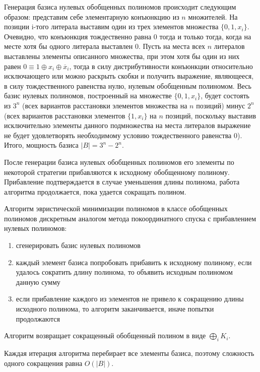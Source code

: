 \documentclass[a4paper,12pt,titlepage,finall]{article}
\begin{document}
Генерация базиса нулевых обобщенных полиномов происходит следующим образом: представим себе элементарную конъюнкцию из $ n $ множителей. На позиции i-того литерала выставим один из трех элементов множества $ \{ 0, 1, x_i \} $. Очевидно, что конъюнкция тождественно равна 0 тогда и только тогда, когда на месте хотя бы одного литерала выставлен 0. Пусть на места всех $ n $ литералов выставлены элементы описанного множества, при этом хотя бы один из них равен $ 0 \equiv 1 \oplus x_i \oplus \overline x_i $, тогда в силу дистрибутивности конъюнкции относительно исключающего или можно раскрыть скобки и получить выражение, являющееся, в силу тождественного равенства нулю, нулевым обобщенным полиномом. Весь базис нулевых полиномов, построенный на множестве $ \{ 0, 1, x_i \} $, будет состоять из $ 3^n $ (всех вариантов расстановки элементов множества на $ n $ позиций) минус $ 2^n $ (всех вариантов расстановки элементов $ \{ 1, x_i \} $ на $ n $ позиций, поскольку выставив исключительно элементы данного подмножества на места литералов выражение не будет удовлетворять необходимому условию тождественного равенства 0). Итого, мощность базиса $ \left| B \right| = 3^n - 2^n. $

После генерации базиса нулевых обобщенных полиномов его элементы по некоторой стратегии прибавляются к исходному обобщенному полиному. Прибавление подтверждается в случае уменьшения длины полинома, работа алгоритма продолжается, пока удается сокращать полином.

Алгоритм эвристической минимизации полиномов в классе обобщенных полиномов дискретным аналогом метода покоординатного спуска с прибавлением нулевых полиномов:
\begin{enumerate}
    \item сгенерировать базис нулевых полиномов
    \item каждый элемент базиса попробовать прибавить к исходному полиному, если удалось сократить длину полинома, то объявить исходным полиномом данную сумму
    \item если прибавление каждого из элементов не привело к сокращению длины исходного полинома, то алгоритм заканчивается, иначе попытки продолжаются
\end{enumerate}

Алгоритм возвращает сокращенный обобщенный полином в виде $ \bigoplus\limits_i K_i $.

Каждая итерация алгоритма перебирает все элементы базиса, поэтому сложность одного сокращения равна $ O \left( \left| B \right| \right) $.
\end{document}
